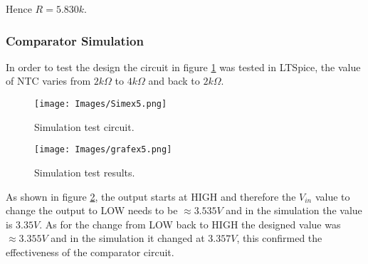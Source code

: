 Hence $R = 5.830k$.

\subsubsection{Comparator Simulation}

In order to test the design the circuit in figure \ref{fig:TestCirc} was tested in LTSpice, the value of NTC varies from $2k\Omega$ to $4k\Omega$ and back to $2k\Omega$.

\begin{figure}[H]
    \centering
    \texttt{[image: Images/Simex5.png]}
    \caption{Simulation test circuit.}
    \label{fig:TestCirc}
\end{figure}

\begin{figure}[H]
    \centering
    \texttt{[image: Images/grafex5.png]}
    \caption{Simulation test results.}
    \label{fig:TestRes}
\end{figure}

As shown in figure \ref{fig:TestRes}, the output starts at HIGH and therefore the $V_{in}$ value to change the output to LOW needs to be $\approx 3.535V$ and in the simulation the value is $3.35V$. As for the change from LOW back to HIGH the designed value was $\approx 3.355V$ and in the simulation it changed at $3.357V$, this confirmed the effectiveness of the comparator circuit.


